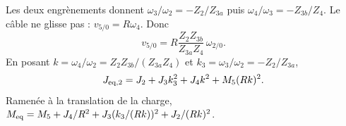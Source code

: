 \begin{corrigebox}
Les deux engrènements donnent
                $\omega_3/\omega_2=-Z_2/Z_{3a}$ puis
                $\omega_4/\omega_3=-Z_{3b}/Z_4$. Le câble ne glisse pas :
                $v_{5/0}=R\omega_4$. Donc
                \[\boxed{v_{5/0}=R\frac{Z_2Z_{3b}}{Z_{3a}Z_4}\,\omega_{2/0}}.\]
En posant $k=\omega_4/\omega_2=Z_2Z_{3b}/(Z_{3a}Z_4)$ et
                $k_3=\omega_3/\omega_2=-Z_2/Z_{3a}$,
                \[J_{\rm eq,2}=J_2+J_3k_3^2+J_4k^2+M_5(Rk)^2.\]
                Ramenée à la translation de la charge,
                $M_{\rm eq}=M_5+J_4/R^2+J_3(k_3/(Rk))^2+J_2/(Rk)^2$.
\end{corrigebox}
